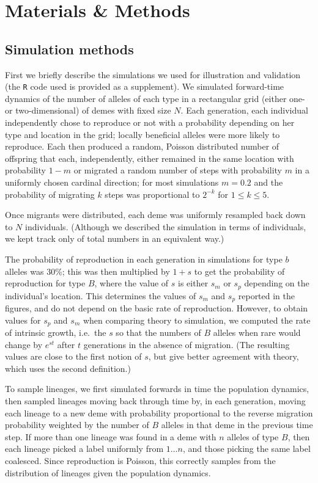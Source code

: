 \documentclass{article}
\newcommand{\linelabel}[1]{}
\begin{document}
\section*{Materials \& Methods}

\subsection{Simulation methods}
\label{ss:simulations}

First we briefly describe the simulations we used for illustration and validation
(the \texttt{R} code used is provided as a supplement).
We simulated forward-time dynamics of the number of alleles of each type in a rectangular grid (either one- or two-dimensional) of demes with fixed size $N$.
Each generation, each individual independently chose to reproduce or not with a probability depending on her type and location in the grid;
locally beneficial alleles were more likely to reproduce.
Each then produced a random, Poisson distributed number of offspring that each, independently, 
either remained in the same location with probability $1-m$ or
migrated a random number of steps with probability $m$
in a uniformly chosen cardinal direction;
for most simulations $m=0.2$ and
the probability of migrating $k$ steps was proportional to $2^{-k}$ for $1\le k \le 5$.
\linelabel{rr:sim_details}
Once migrants were distributed, each deme was uniformly resampled back down to $N$ individuals.
(Although we described the simulation in terms of individuals,
we kept track only of total numbers in an equivalent way.)

The probability of reproduction in each generation in simulations for type $b$ alleles was 30\%; 
this was then multiplied by $1+s$ to get the probability of reproduction for type $B$,
where the value of $s$ is either $s_m$ or $s_p$ depending on the individual's location.
This determines the values of $s_m$ and $s_p$ reported in the figures, 
and do not depend on the basic rate of reproduction.
However, to obtain values for $s_p$ and $s_m$ when comparing theory to simulation,
we computed the rate of intrinsic growth, 
i.e.\ the $s$ so that the numbers of $B$ alleles when rare would change by $e^{st}$ after $t$ generations
in the absence of migration.
(The resulting values are close to the first notion of $s$,
but give better agreement with theory,
which uses the second definition.)

To sample lineages, we first simulated forwards in time the population dynamics,
then sampled lineages moving back through time
by, in each generation,
moving each lineage to a new deme with probability proportional to the reverse migration probability
weighted by the number of $B$ alleles in that deme in the previous time step.
If more than one lineage was found in a deme with $n$ alleles of type $B$,
then each lineage picked a label uniformly from $1 \ldots n$,
and those picking the same label coalesced.
Since reproduction is Poisson, this correctly samples from the distribution of lineages given the population dynamics.
\end{document}
